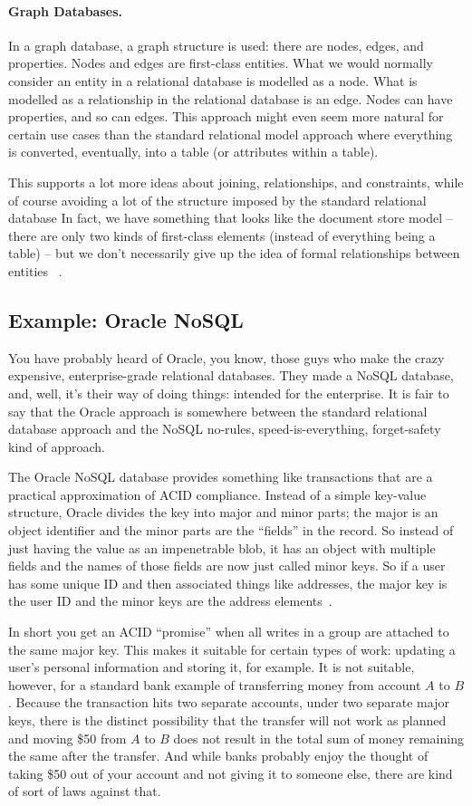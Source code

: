 \paragraph{Graph Databases.}
In a graph database, a graph structure is used: there are nodes, edges, and properties. Nodes and edges are first-class entities. What we would normally consider an entity in a relational database is modelled as a node. What is modelled as a relationship in the relational database is an edge. Nodes can have properties, and so can edges. This approach might even seem more natural for certain use cases than the standard relational model approach where everything is converted, eventually, into a table (or attributes within a table). 

This supports a lot more ideas about joining, relationships, and constraints, while of course avoiding a lot of the structure imposed by the standard relational database In fact, we have something that looks like the document store model -- there are only two kinds of first-class elements (instead of everything being a table) --  but we don't necessarily give up the idea of formal relationships between entities ~\cite{graphdb}.


\subsection*{Example: Oracle NoSQL}
You have probably heard of Oracle, you know, those guys who make the crazy expensive, enterprise-grade relational databases. They made a NoSQL database, and, well, it's their way of doing things: intended for the enterprise. It is fair to say that the Oracle approach is somewhere between the standard relational database approach and the NoSQL no-rules, speed-is-everything, forget-safety kind of approach. 

The Oracle NoSQL database provides something like transactions that are a practical approximation of ACID compliance. Instead of a simple key-value structure, Oracle divides the key into major and minor parts; the major is an object identifier and the minor parts are the ``fields'' in the record. So instead of just having the value as an impenetrable blob, it has an object with multiple fields and the names of those fields are now just called minor keys. So if a user has some unique ID and then associated things like addresses, the major key is the user ID and the minor keys are the address elements~\cite{oraclenosql}.

In short you get an ACID ``promise'' when all writes in a group are attached to the same major key. This makes it suitable for certain types of work: updating a user's personal information and storing it, for example. It is not suitable, however, for a standard bank example of transferring money from account $A$ to $B$. Because the transaction hits two separate accounts, under two separate major keys, there is the distinct possibility that the transfer will not work as planned and moving \$50 from $A$ to $B$ does not result in the total sum of money remaining the same after the transfer. And while banks probably enjoy the thought of taking \$50 out of your account and not giving it to someone else, there are kind of sort of laws against that.


